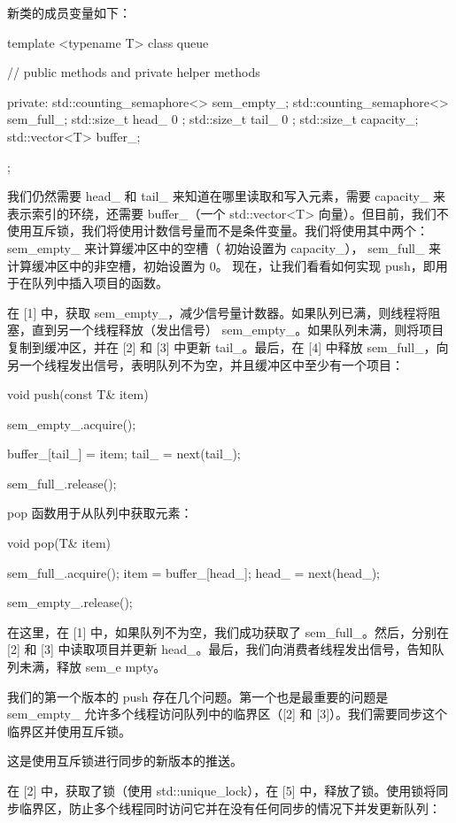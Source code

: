 新类的成员变量如下：

\begin{cpp}
template <typename T>
class queue {
// public methods and private helper methods

private:
    std::counting_semaphore<> sem_empty_;
    std::counting_semaphore<> sem_full_;
    std::size_t head_{ 0 };
    std::size_t tail_{ 0 };
    std::size_t capacity_;
    std::vector<T> buffer_;
};
\end{cpp}

我们仍然需要 head\_ 和 tail\_ 来知道在哪里读取和写入元素，需要 capacity\_ 来表示索引的环绕，还需要 buffer\_（一个 std::vector<T> 向量）。但目前，我们不使用互斥锁，我们将使用计数信号量而不是条件变量。我们将使用其中两个： sem\_empty\_ 来计算缓冲区中的空槽（ 初始设置为 capacity\_）， sem\_full\_ 来计算缓冲区中的非空槽，初始设置为 0。
现在，让我们看看如何实现 push，即用于在队列中插入项目的函数。

在 [1] 中，获取 sem\_empty\_，减少信号量计数器。如果队列已满，则线程将阻塞，直到另一个线程释放（发出信号） sem\_empty\_。如果队列未满，则将项目复制到缓冲区，并在 [2] 和 [3] 中更新 tail\_。最后，在 [4] 中释放 sem\_full\_，向另一个线程发出信号，表明队列不为空，并且缓冲区中至少有一个项目：

\begin{cpp}
void push(const T& item) {
    sem_empty_.acquire();

    buffer_[tail_] = item;
    tail_ = next(tail_);

    sem_full_.release();
}
\end{cpp}

pop 函数用于从队列中获取元素：

\begin{cpp}
void pop(T& item) {
    sem_full_.acquire();
    item = buffer_[head_];
    head_ = next(head_);

    sem_empty_.release();
}
\end{cpp}

在这里，在 [1] 中，如果队列不为空，我们成功获取了 sem\_full\_。然后，分别在 [2] 和 [3] 中读取项目并更新 head\_。最后，我们向消费者线程发出信号，告知队列未满，释放 sem\_e mpty。

我们的第一个版本的 push 存在几个问题。第一个也是最重要的问题是 sem\_empty\_ 允许多个线程访问队列中的临界区（[2] 和 [3]）。我们需要同步这个临界区并使用互斥锁。

这是使用互斥锁进行同步的新版本的推送。

在 [2] 中，获取了锁（使用 std::unique\_lock），在 [5] 中，释放了锁。使用锁将同步临界区，防止多个线程同时访问它并在没有任何同步的情况下并发更新队列：

